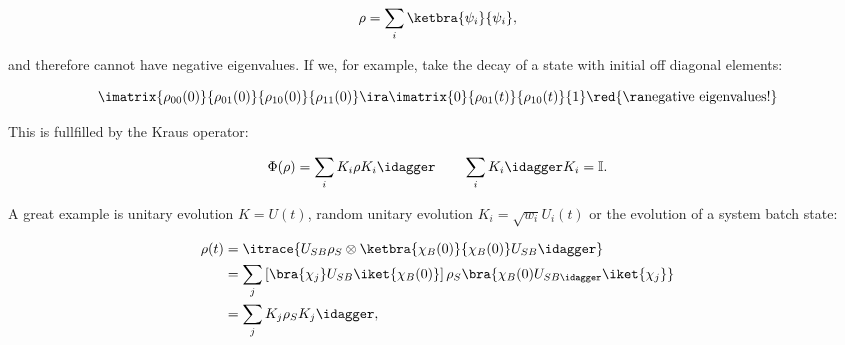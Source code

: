   \begin{equation}\label{eq:linrelax_1}
    \rho = \sum_i\ketbra{\psi_i}{\psi_i},
  \end{equation}
  
  \noindent and  therefore cannot  have negative  eigenvalues.  If we,  for example,  take the
  decay of a state with initial off diagonal elements:
  
  \begin{equation}\label{eq:linrelax_2}
    \imatrix{\rho_{00}(0)}{\rho_{01}(0)}{\rho_{10}(0)}{\rho_{11}(0)} \ira \imatrix{0}{\rho_{01}(t)}{\rho_{10}(t)}{1} \red{\ra \text{negative eigenvalues!}}
  \end{equation}
  

  \noindent This is fullfilled by the Kraus operator:
  
  \begin{equation}\label{eq:linrelax_4}
    \Phi(\rho) = \sum_iK_i\rho K_i\idagger\qquad \sum_iK_i\idagger K_i = \mathbb{I}.
  \end{equation}
  
  \noindent  A great  example is  unitary evolution  $ K  = U(t)  $, random  unitary evolution
  $ K_i = \sqrt{w_i}U_i(t) $ or the evolution of a system batch state:
  
  \begin{equation}\label{eq:linrelax_5}
    \begin{aligned}
      \rho(t) & = \itrace{U_{SB} \rho_S\otimes\ketbra{\chi_B(0)}{\chi_B(0)}U_{SB}\idagger}\\
      & = \sum_j\left[\bra{\chi_j}U_{SB}\iket{\chi_B(0)}\right]\rho_{S}\bra{\chi_{B}(0)U_{SB\idagger}\iket{\chi_j}}\\
      & = \sum_j K_j\rho_{S}K_j\idagger,
    \end{aligned}
  \end{equation}
 
